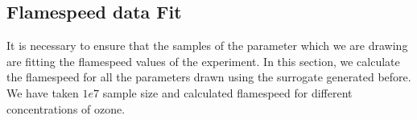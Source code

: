\subsection{Flamespeed data Fit}

 It is necessary to ensure that the samples of the parameter which we are drawing are fitting the flamespeed values of the experiment. In this section, we calculate the flamespeed for all the parameters drawn using the surrogate generated before. We have taken $1e7$ sample size and calculated flamespeed for different concentrations of ozone.

 \begin{figure}[H]
\end{figure}


